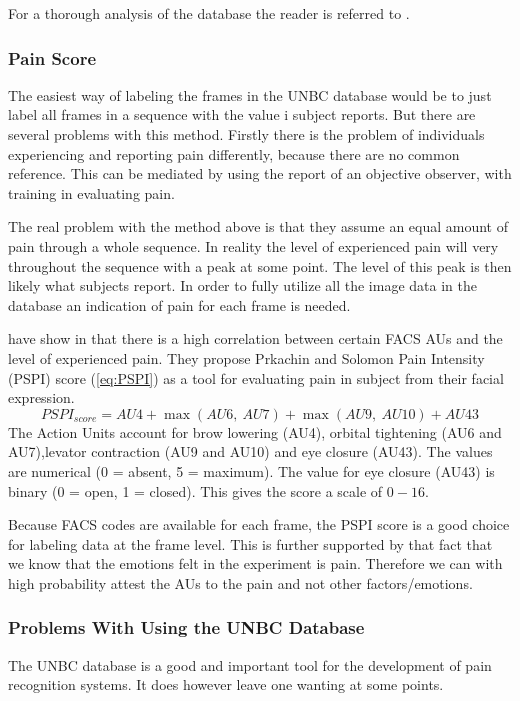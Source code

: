 \documentclass[Main]{subfiles}
\begin{document}
		For a thorough analysis of the database the reader is referred to \cite{Lucey2012}.
		
		\subsubsection{Pain Score} %
			\label{ssub:pain_score}
			The easiest way of labeling the frames in the UNBC database would be to just label all frames in a sequence with the value i subject reports.
			But there are several problems with this method.
			Firstly there is the problem of individuals experiencing and reporting pain differently, because there are no common reference.
			This can be mediated by using the report of an objective observer, with training in evaluating pain.

			The real problem with the method above is that they assume an equal amount of pain through a whole sequence.
			In reality the level of experienced pain will very throughout the sequence with a peak at some point.
			The level of this peak is then likely what subjects report.
			In order to fully utilize all the image data in the database an indication of pain for each frame is needed.

			 have show in \cite{Prkachin1992} that there is a high correlation between certain FACS AUs and the level of experienced pain.
			They propose Prkachin and Solomon Pain Intensity (PSPI) score (\ref{eq:PSPI}) as a tool for evaluating pain in subject from their facial expression.
			\begin{equation}
				\label{eq:PSPI} 
				PSPI_{score} = 
					AU4 + \max(AU6,\ AU7) + \max(AU9,\ AU10) + AU43
			\end{equation}
			The Action Units account for brow lowering (AU4), orbital tightening (AU6 and AU7),levator contraction (AU9 and AU10) and eye closure (AU43).
			The values are numerical (0 = absent, 5 = maximum).
			The value for eye closure (AU43) is binary (0 = open, 1 = closed).
			This gives the score a scale of $0-16$.

			Because FACS codes are available for each frame, the PSPI score is a good choice for labeling data at the frame level.
			This is further supported by that fact that we know that the emotions felt in the experiment is pain.
			Therefore we can with high probability attest the AUs to the pain and not other factors/emotions.


		\subsubsection{Problems With Using the UNBC Database} %
			\label{ssub:problems_with_using_the_unbc_database}
			The UNBC database is a good and important tool for the development of pain recognition systems.
			It does however leave one wanting at some points.
\end{document}
